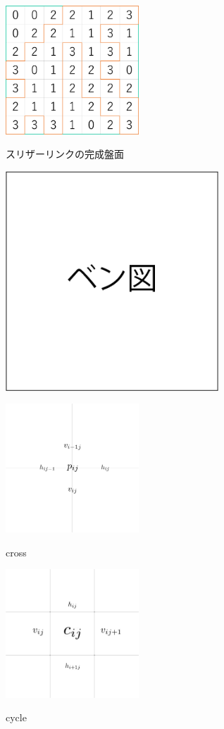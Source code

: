 \begin{clearpagefigure}
  \includegraphics[width=5cm]{fig/slitherlink.png}
  \caption{スリザーリンクの完成盤面}
\end{clearpagefigure}

\begin{clearpagefigure}
  \includegraphics[width=8cm,clip]{fig/vennDiagram.png}
  \caption{}
  \label{fig:VennDiagram}
\end{clearpagefigure}

\begin{clearpagefigure}
  \includegraphics[width=5cm]{fig/cross.png}
  \caption{cross}
  \label{fig:cross}
\end{clearpagefigure}

\begin{clearpagefigure}
  \includegraphics[width=5cm]{fig/cycle.png}
  \caption{cycle}
  \label{fig:cycle}
\end{clearpagefigure}
